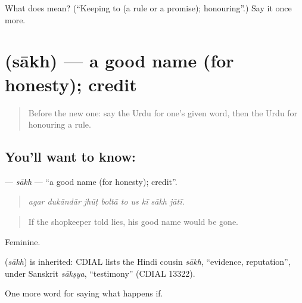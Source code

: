 \begin{tcolorbox}[breakable,colback=teal!4,colframe=teal!35!black,title={Before you move on}]
What does  mean? (\textquotedblleft{}Keeping to (a rule or a promise); honouring\textquotedblright{}.) Say it once more.
\end{tcolorbox}
\section[\texorpdfstring{\ur{ساکھ} (sākh)}{ساکھ (sākh)}]{ (sākh) — a good name (for honesty); credit}

\label{lesson:UR-C531-sakh}



\begin{quote}
Before the new one: say the Urdu for one's given word, then the Urdu for honouring a rule.
\end{quote}

\subsection*{You'll want to know: }
\textbf{} — \emph{sākh} — \textquotedblleft{}a good name (for honesty); credit\textquotedblright{}.

\begin{quote}
        
\end{quote}

\begin{quote}
\emph{agar dukāndār jhūṭ boltā to us kī sākh jātī.}
\end{quote}

\begin{quote}
If the shopkeeper told lies, his good name would be gone.
\end{quote}

Feminine.

\begin{cousinweb}
\textbf{} (\emph{sākh}) is inherited: CDIAL lists the Hindi cousin \emph{sākh}, \textquotedblleft{}evidence, reputation\textquotedblright{}, under Sanskrit \emph{sākṣya}, \textquotedblleft{}testimony\textquotedblright{} (CDIAL 13322).
\end{cousinweb}

\begin{grammarlens}[title={What you've built}]
One more word for saying what happens if.
\end{grammarlens}

